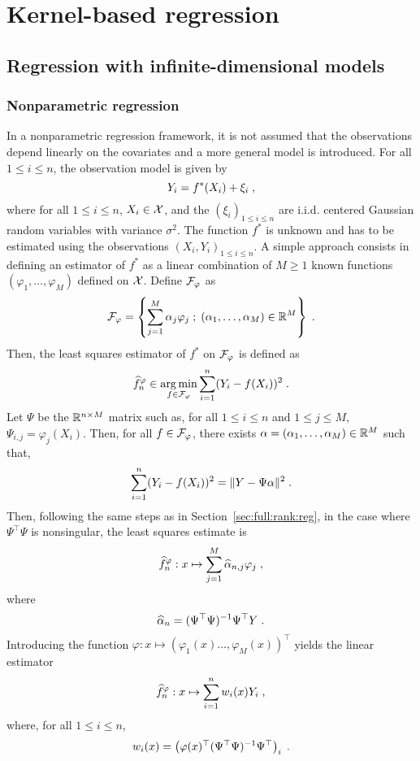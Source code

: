 \chapter{Kernel-based regression}
\minitoc

\section{Regression with infinite-dimensional models}

\subsection{Nonparametric regression}
In a nonparametric regression framework, it is not assumed that the observations depend linearly on the covariates and a more general model is introduced. For all $1\leqslant i\leqslant n$, the observation model is given by
\[
Y_{i}=f^*(X_{i})+\xi_{i}\;,
\]
where for all $1\leqslant i\leqslant n$, $X_i\in\mathcal{X}$, and the $(\xi_{i})_{1\leqslant i \leqslant n}$ are i.i.d. centered Gaussian random variables with variance $\sigma^2$. The function $f^*$ is unknown and has to be estimated using the observations $(X_i,Y_i)_{1\leqslant i\leqslant n}$. A simple approach consists in defining an estimator of $f^*$ as a linear combination of $M\geqslant 1$ known functions $(\varphi_1,\ldots,\varphi_M)$ defined on $\mathcal{X}$. Define $\mathcal{F}_\varphi$ as
\[
\mathcal{F}_\varphi = \left\{\sum_{j=1}^M \alpha_j \varphi_j\;;\; (\alpha_1,\ldots,\alpha_M)\in\mathbb{R}^M\right\}\;.
\]
Then, the least squares estimator of $f^*$ on $\mathcal{F}_\varphi$ is defined as
\[
\widehat f^\varphi_n\in  \argmin_{f \in \calF_\varphi}  \sum_{i=1}^n(Y_i - f(X_i))^2\eqsp.
\]
Let $\Psi$ be the $\mathbb{R}^{n\times M}$ matrix such as, for all $1\leqslant i\leqslant n$ and $1\leqslant j\leqslant M$, $\Psi_{i,j} = \varphi_j(X_i)$. Then, for all $f \in \mathcal{F}_\varphi$, there exists $\alpha = (\alpha_1,\ldots,\alpha_M)\in\mathbb{R}^M$ such that,
\[
 \sum_{i=1}^n(Y_i - f(X_i))^2 = \|Y - \Psi \alpha\|^2\;.
\]
Then, following the same steps as in Section~\ref{sec:full:rank:reg}, in the case where $\Psi^\top \Psi$ is nonsingular, the least squares estimate is
\begin{equation}
\label{eq:def:nonparam:reg}
\widehat f^\varphi_n: x\mapsto \sum_{j=1}^M \widehat\alpha_{n,j} \varphi_j\;,
\end{equation}
where
\[
\widehat\alpha_{n} = (\Psi^\top \Psi)^{-1}\Psi^\top Y\;.
\]
Introducing the function $\varphi: x\mapsto (\varphi_1(x)\ldots,\varphi_M(x))^\top$ yields the linear estimator 
\[
\widehat f^\varphi_n: x \mapsto \sum_{i = 1}^n w_i(x)Y_i\;,
\]
where, for all $1\leqslant i\leqslant n$,
\[
w_i(x) = \left(\varphi(x)^\top(\Psi^\top\Psi)^{-1}\Psi^\top\right)_i\;.
\]

